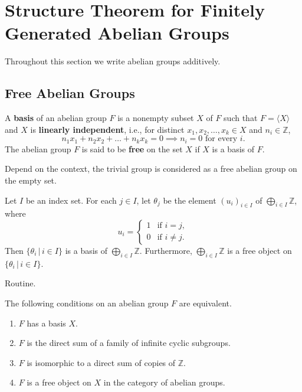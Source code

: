 
\section{Structure Theorem for Finitely Generated Abelian Groups}
Throughout this section we write abelian groups additively.
\subsection{Free Abelian Groups}


\begin{definition} \label{def-free-abelian}
	A \textbf{basis} of an abelian group $F$ is a nonempty subset $X$ of $F$ such that $F = \langle X \rangle$ and $X$ is \textbf{linearly independent}, i.e., for distinct $x_1, x_2, \dots, x_k \in X$ and $n_i \in \mathbb{Z}$,
	\begin{equation*}
		n_1x_1 + n_2x_2 + \dots + n_kx_k = 0 \implies n_i = 0 \text{ for every } i.
	\end{equation*}
	The abelian group $F$ is said to be \textbf{free} on the set $X$ if $X$ is a basis of $F$. 
\end{definition}
\begin{remark}
	Depend on the context, the trivial group is considered as a free abelian group on the empty set.
\end{remark}
\begin{lemma} \label{lemma-basis-for-sum-Z}
	Let $I$ be an index set. For each $j \in I$, let $\theta_j$ be the element $(u_i)_{i\in I}$ of $\bigoplus_{i\in I} \mathbb{Z}$, where
	\begin{equation*}
		u_i = \begin{cases}
			1 & \text{if } i = j,\\
			0 & \text{if } i\neq j.
		\end{cases}
	\end{equation*} Then $\{\theta_i \,|\,  i \in I\}$ is a basis of $\bigoplus_{i\in I} \mathbb{Z}$. Furthermore, $\bigoplus_{i\in I} \mathbb{Z}$ is a free object on  $\{\theta_i \,|\, i \in I\}$.
\end{lemma}
\begin{sketch}
	Routine.
\end{sketch}
\begin{proposition} \label{prop-free-abelian-eqv}
	The following conditions on an abelian group $F$ are equivalent.
	\begin{enumerate}[(1)]
		\item $F$ has a basis $X$.
		\item $F$ is the  direct sum of a family of infinite cyclic subgroups.
		\item $F$ is isomorphic to a direct sum of copies of $\mathbb{Z}$.
		\item $F$ is a free object on $X$ in the category of abelian groups.
	\end{enumerate}
\end{proposition}
